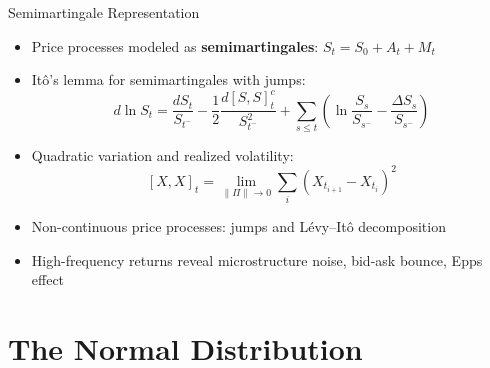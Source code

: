 \documentclass[9pt, aspectratio=169, t]{beamer}
\theoremstyle{definition}
\begin{document}
\begin{frame}{Semimartingale Representation}
\begin{itemize}
\item Price processes modeled as \textbf{semimartingales}: $S_t = S_0 + A_t + M_t$
\item It\^{o}'s lemma for semimartingales with jumps:
\[
d\ln S_t = \frac{dS_t}{S_{t^-}} - \frac{1}{2}\frac{d[S,S]_t^c}{S_{t^-}^2} + \sum_{s \leq t}\left(\ln\frac{S_s}{S_{s^-}} - \frac{\Delta S_s}{S_{s^-}}\right)
\]
\item Quadratic variation and realized volatility:
\[
[X,X]_t = \lim_{\|\Pi\| \to 0} \sum_{i} (X_{t_{i+1}} - X_{t_i})^2
\]
\item Non-continuous price processes: jumps and L\'{e}vy--It\^{o} decomposition
\item High-frequency returns reveal microstructure noise, bid-ask bounce, Epps effect
\end{itemize}
\end{frame}

\section{The Normal Distribution}
\end{document}

